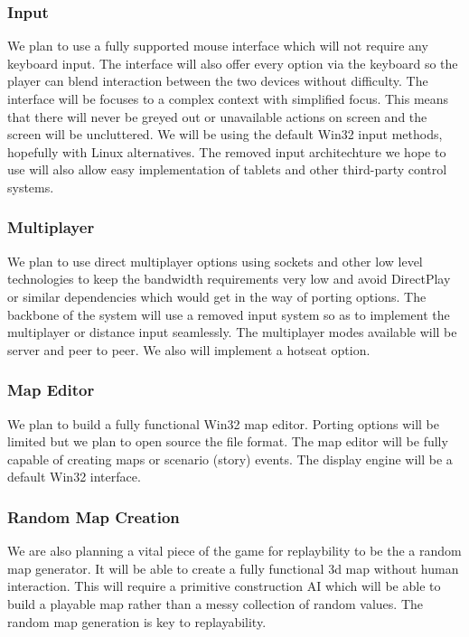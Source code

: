 \documentclass[a4paper,twocolumn]{article}
\begin{document}
\subsubsection{Input}

We plan to use a fully supported mouse interface which will not require any keyboard input. The interface will also offer every option via the keyboard so the player can blend interaction between the two devices without difficulty. The interface will be focuses to a complex context with simplified focus. This means that there will never be greyed out or unavailable actions on screen and the screen will be uncluttered. We will be using the default Win32 input methods, hopefully with Linux alternatives. The removed input architechture we hope to use will also allow easy implementation of tablets and other third-party control systems.

\subsubsection{Multiplayer}

We plan to use direct multiplayer options using sockets and other low level technologies to keep the bandwidth requirements very low and avoid DirectPlay or similar dependencies which would get in the way of porting options. The backbone of the system will use a removed input system so as to implement the multiplayer or distance input seamlessly. The multiplayer modes available will be server and peer to peer. We also will implement a hotseat option.

\subsubsection{Map Editor}

We plan to build a fully functional Win32 map editor. Porting options will be limited but we plan to open source the file format. The map editor will be fully capable of creating maps or scenario (story) events. The display engine will be a default Win32 interface.

\subsubsection{Random Map Creation}

We are also planning a vital piece of the game for replaybility to be the a random map generator. It will be able to create a fully functional 3d map without human interaction. This will require a primitive construction AI which will be able to build a playable map rather than a messy collection of random values. The random map generation is key to replayability.
\end{document}
